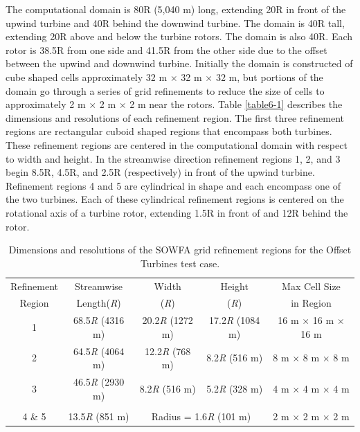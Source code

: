 The computational domain is 80R (5,040 m) long, extending 20R in front of the upwind turbine and 40R behind the downwind turbine. The domain is 40R tall, extending 20R above and below the turbine rotors. The domain is also 40R. Each rotor is 38.5R from one side and 41.5R from the other side due to the offset between the upwind and downwind turbine. Initially the domain is constructed of cube shaped cells approximately 32 m $\times$ 32 m $\times$ 32 m, but portions of the domain go through a series of grid refinements to reduce the size of cells to approximately 2 m $\times$ 2 m $\times$ 2 m near the rotors. Table \ref{table6-1} describes the dimensions and resolutions of each refinement region. The first three refinement regions are rectangular cuboid shaped regions that encompass both turbines. These refinement regions are centered in the computational domain with respect to width and height. In the streamwise direction refinement regions 1, 2, and 3 begin 8.5R, 4.5R, and 2.5R (respectively) in front of the upwind turbine. Refinement regions 4 and 5 are cylindrical in shape and each encompass one of the two turbines. Each of these cylindrical refinement regions is centered on the rotational axis of a turbine rotor, extending 1.5R in front of and 12R behind the rotor.


\begin{table} \label{Table6-1}
\centering
\caption{ Dimensions and resolutions of the SOWFA grid refinement regions for the Offset Turbines test case.}
\begin{tabular}{c c c c c}
\hline
Refinement & Streamwise  & Width & Height & Max Cell Size\\
Region & Length(\emph{R}) & (\emph{R})  &  (\emph{R}) & in Region\\
\hline
1 & 68.5\emph{R} (4316 m)  & 20.2\emph{R} (1272 m) & 17.2\emph{R} (1084 m) & 16 m $\times$ 16 m $\times$ 16 m\\
2 & 64.5\emph{R} (4064 m)  & 12.2\emph{R} (768 m) & 8.2\emph{R} (516 m)  & 8 m $\times$ 8 m $\times$ 8 m\\
3 & 46.5\emph{R} (2930 m)  & 8.2\emph{R} (516 m) & 5.2\emph{R} (328 m)  & 4 m $\times$ 4 m $\times$ 4 m\\
\\
4 \& 5 & 13.5\emph{R} (851 m)    & \multicolumn{2}{c}{Radius = 1.6\emph{R} (101 m)}   & 2 m $\times$ 2 m $\times$ 2 m\\
\hline
\end{tabular}
\end{table}

